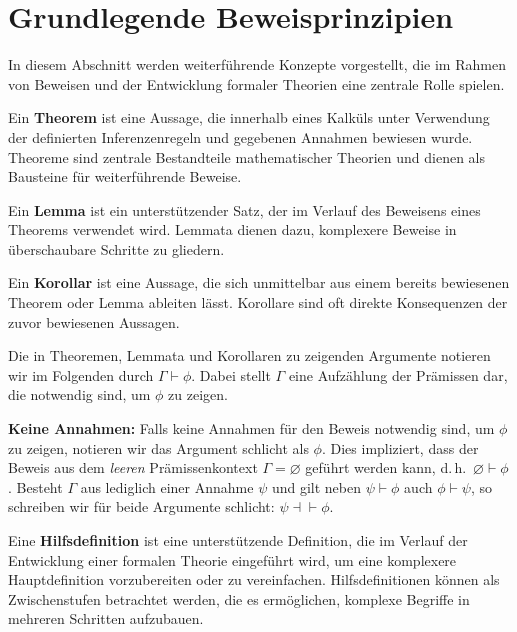 \documentclass[main.tex]{subfiles}
\begin{document}
\section{Grundlegende Beweisprinzipien}

In diesem Abschnitt werden weiterführende Konzepte vorgestellt, die im Rahmen von Beweisen und der Entwicklung formaler Theorien eine zentrale Rolle spielen.


\begin{definition}[Theorem]
Ein \textbf{Theorem} ist eine Aussage, die innerhalb eines Kalküls unter Verwendung der definierten Inferenzenregeln und gegebenen Annahmen bewiesen wurde. Theoreme sind zentrale Bestandteile mathematischer Theorien und dienen als Bausteine für weiterführende Beweise.
\end{definition}

\begin{definition}[Lemma]
Ein \textbf{Lemma} ist ein unterstützender Satz, der im Verlauf des Beweisens eines Theorems verwendet wird. Lemmata dienen dazu, komplexere Beweise in überschaubare Schritte zu gliedern.
\end{definition}

\begin{definition}[Korollar]
Ein \textbf{Korollar} ist eine Aussage, die sich unmittelbar aus einem bereits bewiesenen Theorem oder Lemma ableiten lässt. Korollare sind oft direkte Konsequenzen der zuvor bewiesenen Aussagen.
\end{definition}
\begin{remark}
Die in Theoremen, Lemmata und Korollaren zu zeigenden Argumente notieren wir im Folgenden durch \(\Gamma \vdash \phi\). Dabei stellt \(\Gamma\) eine Aufzählung der Prämissen dar, die notwendig sind, um \(\phi\) zu zeigen.

\noindent
\textbf{Keine Annahmen:} Falls keine Annahmen für den Beweis notwendig sind, um \(\phi\) zu zeigen, notieren wir das Argument schlicht als \(\phi\). Dies impliziert, dass der Beweis aus dem \emph{leeren} Prämissenkontext \(\Gamma = \varnothing\) geführt werden kann, d.\,h.\ \(\varnothing \vdash \phi\).
Besteht \(\Gamma\) aus lediglich einer Annahme \(\psi\) und gilt neben \(\psi\vdash\phi\) auch \(\phi\vdash\psi\), so schreiben wir für beide Argumente schlicht: \(\psi\dashv\vdash \phi\).
\end{remark}

\begin{definition}[Hilfsdefinition]
Eine \textbf{Hilfsdefinition} ist eine unterstützende Definition, die im Verlauf der Entwicklung einer formalen Theorie eingeführt wird, um eine komplexere Hauptdefinition vorzubereiten oder zu vereinfachen. Hilfsdefinitionen können als Zwischenstufen betrachtet werden, die es ermöglichen, komplexe Begriffe in mehreren Schritten aufzubauen.
\end{definition}
\end{document}
